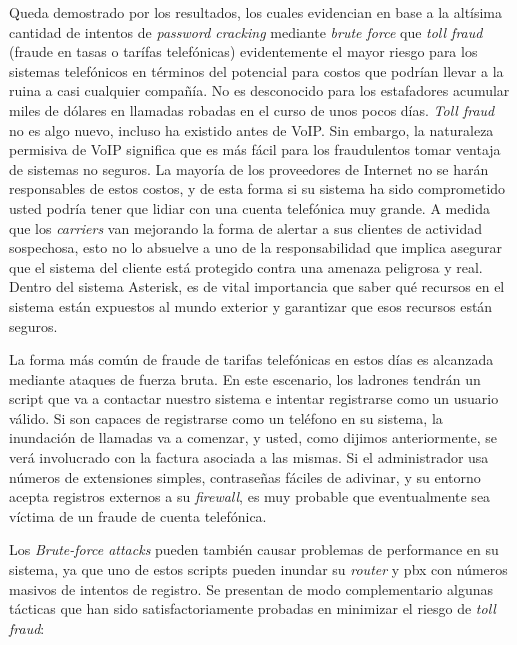 \documentclass[a4paper,12pt]{report}
\begin{document}
{Queda demostrado por los resultados, los cuales evidencian en base a la
altísima cantidad de intentos de \emph{password cracking} mediante \emph{brute
force} que \emph{toll fraud} (fraude en tasas o tarífas telefónicas) evidentemente 
el mayor riesgo para los sistemas telefónicos en términos del potencial
para costos que podrían llevar a la ruina a casi cualquier compañía. No es
desconocido para los estafadores acumular miles de dólares en llamadas robadas
en el curso de unos pocos días. 
\emph{Toll fraud} no es algo nuevo, incluso ha existido antes de VoIP. Sin
embargo, la naturaleza permisiva de VoIP significa que es más fácil para los
fraudulentos tomar ventaja de sistemas no seguros. La mayoría de los
proveedores de Internet no se harán responsables de estos costos, y de esta
forma si su sistema ha sido comprometido usted podría tener que lidiar con una
cuenta telefónica muy grande. A medida que los \emph{carriers} van mejorando la forma
de alertar a sus clientes de actividad sospechosa, esto no lo absuelve a uno de
la responsabilidad que implica asegurar que el sistema del cliente está
protegido contra una amenaza peligrosa y real. Dentro del sistema Asterisk,
es de vital importancia que saber qué recursos en el sistema están
expuestos al mundo exterior y garantizar que esos recursos están seguros.

La forma más común de fraude de tarifas telefónicas en estos días es alcanzada
mediante ataques de fuerza bruta. En este
escenario, los ladrones tendrán un script que va a contactar nuestro sistema e
intentar registrarse como un usuario válido. Si son capaces de registrarse
como un teléfono en su sistema, la inundación de llamadas va a comenzar, y
usted, como dijimos anteriormente, se verá involucrado con la factura asociada
a las mismas. Si el administrador usa números de extensiones simples,
contraseñas fáciles de adivinar, y su entorno acepta registros externos a su
\emph{firewall}, es muy probable que eventualmente sea víctima de un fraude de cuenta
telefónica. 

Los \emph{Brute-force attacks} pueden también causar problemas de performance
en su sistema, ya que uno de estos scripts pueden inundar su \emph{router} y \ac{pbx} con
números masivos de intentos de registro. Se presentan de modo complementario
algunas tácticas que han sido satisfactoriamente probadas en minimizar el
riesgo de \emph{toll fraud}:

}
\end{document}
